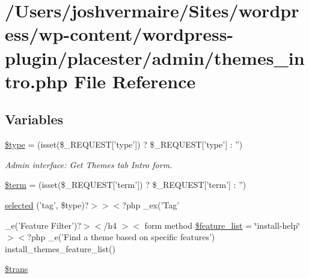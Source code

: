 \hypertarget{themes__intro_8php}{
\section{/Users/joshvermaire/Sites/wordpress/wp-\/content/wordpress-\/plugin/placester/admin/themes\_\-intro.php File Reference}
\label{d9/dc8/themes__intro_8php}
}
\subsection*{Variables}
\begin{DoxyCompactItemize}
\item 
\hyperlink{themes__intro_8php_a9a4a6fba2208984cabb3afacadf33919}{\$type} = (isset(\$\_\-REQUEST\mbox{[}'type'\mbox{]}) ? \$\_\-REQUEST\mbox{[}'type'\mbox{]} : '')
\begin{DoxyCompactList}\small\item\em Admin interface: Get Themes tab Intro form. \end{DoxyCompactList}\item 
\hyperlink{themes__intro_8php_aab8e9e6e6b80da234ae2c60691f73262}{\$term} = (isset(\$\_\-REQUEST\mbox{[}'term'\mbox{]}) ? \$\_\-REQUEST\mbox{[}'term'\mbox{]} : '')
\item 
\hyperlink{themes__intro_8php_a7b50ba9cdd56f1b15b8378182e0c5498}{selected} ('tag', \$type)?$>$$>$$<$?php \_\-ex('Tag'
\item 
\_\-e('Feature Filter')?$>$$<$/h4 $>$$<$ form method \hyperlink{themes__intro_8php_a9fb473b7531b33269d4897bf53be328b}{\$feature\_\-list} = \char`\"{}install-\/help\char`\"{}$>$$<$?php \_\-e('Find a theme based on specific features') install\_\-themes\_\-feature\_\-list()
\item 
\hyperlink{themes__intro_8php_ac75852aae94b46848119a6d7c922cf2e}{\$trans}
\end{DoxyCompactItemize}


